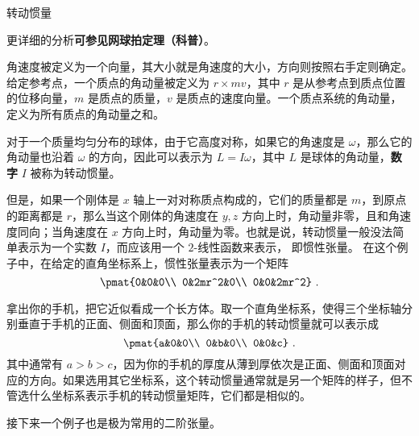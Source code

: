 \begin{example}{转动惯量}

更详细的分析\textbf{可参见网球拍定理（科普）}。

角速度被定义为一个向量，其大小就是角速度的大小，方向则按照右手定则确定。给定参考点，一个质点的角动量被定义为 ${r}\times m{v}$，其中 ${r}$ 是从参考点到质点位置的位移向量，$m$ 是质点的质量，${v}$ 是质点的速度向量。一个质点系统的角动量，定义为所有质点的角动量之和。

对于一个质量均匀分布的球体，由于它高度对称，如果它的角速度是 ${\omega}$，那么它的角动量也沿着 ${\omega}$ 的方向，因此可以表示为 ${L}=I{\omega}$，其中 ${L}$ 是球体的角动量，\textbf{数字} $I$ 被称为转动惯量。

但是，如果一个刚体是 $x$ 轴上一对对称质点构成的，它们的质量都是 $m$，到原点的距离都是 $r$，那么当这个刚体的角速度在 $y,z$ 方向上时，角动量非零，且和角速度同向；当角速度在 $x$ 方向上时，角动量为零。也就是说，转动惯量一般没法简单表示为一个实数 $I$，而应该用一个 $2$-线性函数来表示， 即惯性张量。 在这个例子中，在给定的直角坐标系上，惯性张量表示为一个矩阵
\begin{equation}
\pmat{0&0&0\\ 0&2mr^2&0\\ 0&0&2mr^2}~.
\end{equation}

拿出你的手机，把它近似看成一个长方体。取一个直角坐标系，使得三个坐标轴分别垂直于手机的正面、侧面和顶面，那么你的手机的转动惯量就可以表示成
\begin{equation}
\pmat{a&0&0\\ 0&b&0\\ 0&0&c}~.
\end{equation}
其中通常有 $a>b>c$，因为你的手机的厚度从薄到厚依次是正面、侧面和顶面对应的方向。如果选用其它坐标系，这个转动惯量通常就是另一个矩阵的样子，但不管选什么坐标系表示手机的转动惯量矩阵，它们都是相似的。
\end{example}

接下来一个例子也是极为常用的二阶张量。

